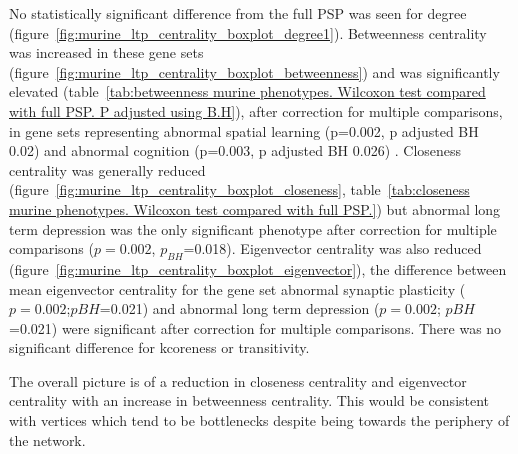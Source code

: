 No statistically significant difference from the full PSP was seen for degree (figure~\ref{fig:murine_ltp_centrality_boxplot_degree1}). Betweenness centrality was  increased in these gene sets (figure~\ref{fig:murine_ltp_centrality_boxplot_betweenness}) and was significantly elevated (table~\ref{tab:betweenness murine phenotypes. Wilcoxon test compared with full PSP. P adjusted using B.H}), after correction for multiple comparisons, in gene sets representing abnormal spatial learning (p=0.002, p adjusted BH 0.02) and  abnormal cognition (p=0.003, p adjusted BH 0.026) . Closeness centrality was generally reduced  (figure~\ref{fig:murine_ltp_centrality_boxplot_closeness}, table~\ref{tab:closeness murine phenotypes. Wilcoxon test compared with full PSP.}) but abnormal long term depression was the only significant phenotype after correction for multiple comparisons ($p=0.002$, $p_{BH}$=0.018). Eigenvector centrality was also reduced (figure~\ref{fig:murine_ltp_centrality_boxplot_eigenvector}), the difference between mean eigenvector centrality for the gene set abnormal synaptic plasticity ($p=0.002$;$p BH$=0.021) and abnormal long term depression ($p=0.002$; $p BH$=0.021) were significant after correction for multiple comparisons. There was no significant difference for kcoreness or transitivity.

The overall picture is of a reduction in closeness centrality and eigenvector centrality with an increase in betweenness centrality. This would be consistent with vertices which tend to be bottlenecks despite being towards the periphery of the network. 






